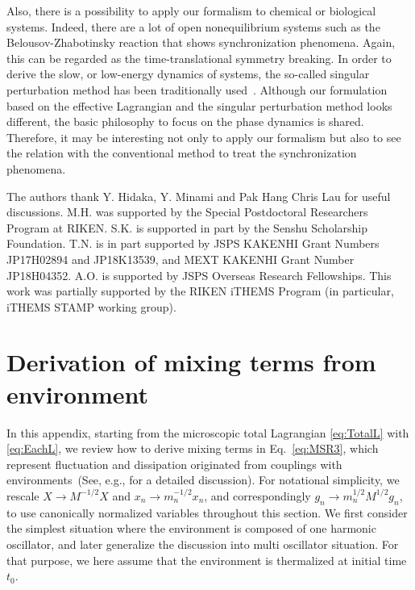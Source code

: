 \documentclass[a4paper,11pt]{article}
\begin{document}
\medskip
Also, there is a possibility to apply our formalism to chemical or biological 
systems. 
Indeed, there are a lot of open nonequilibrium systems 
such as the Belousov-Zhabotinsky reaction that shows synchronization phenomena. 
Again, this can be regarded as the time-translational symmetry breaking.
In order to derive the slow, or low-energy dynamics of systems, 
the so-called singular perturbation method has been traditionally used~\cite{Kuramoto,MoriKuramoto}.  
Although our formulation based on the effective Lagrangian and 
the singular perturbation method looks different, 
the basic philosophy to focus on the phase dynamics is shared.
Therefore, it may be interesting not only to apply our formalism 
but also to see the relation with the conventional method to treat 
the synchronization phenomena. 








\acknowledgments 
The authors thank Y. Hidaka, Y. Minami and Pak Hang Chris Lau for useful discussions.
M.H. was supported by the Special Postdoctoral Researchers Program
at RIKEN.
S.K. is supported in part by the Senshu Scholarship Foundation.
T.N.  is in part supported by JSPS KAKENHI Grant Numbers JP17H02894 and JP18K13539, and MEXT KAKENHI Grant Number JP18H04352.
A.O. is supported by JSPS Overseas Research Fellowships.
This work was partially supported by the RIKEN iTHEMS Program 
(in particular, iTHEMS STAMP working group).


\appendix
\section{Derivation of mixing terms from environment}\label{kim}

In this appendix, starting from the microscopic total Lagrangian 
\eqref{eq:TotalL} with \eqref{eq:EachL}, 
we review how to derive mixing terms in Eq.~\eqref{eq:MSR3}, which represent
fluctuation and dissipation originated from couplings with 
environments~(See, e.g., \cite{Kamenev:2009jj} for a detailed discussion). 
For notational simplicity, we rescale $X\to M^{-1/2}X$ and $x_n\to m_n^{-1/2}x_n$, and correspondingly $g_n\to m_n^{1/2}M^{1/2}g_n$, to use canonically normalized variables throughout this section.
We first consider the simplest situation where the environment is composed of 
one harmonic oscillator, and later generalize the discussion 
into multi oscillator situation.
For that purpose, we here assume that the environment is thermalized 
at initial time $t_0$.
\end{document}
